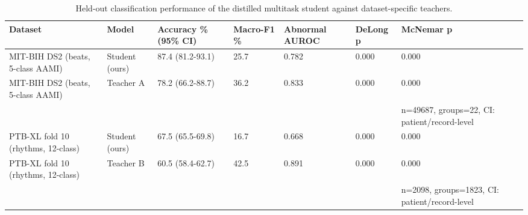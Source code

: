 \begin{table}[t]
\centering
\caption{Held-out classification performance of the distilled multitask student against dataset-specific teachers.}
\label{tab:classification}
\begin{tabular}{lllllll}
\toprule
Dataset & Model & Accuracy \% (95\% CI) & Macro-F1 \% & Abnormal AUROC & DeLong p & McNemar p \\
\midrule
MIT-BIH DS2 (beats, 5-class AAMI) & Student (ours) & 87.4 (81.2-93.1) & 25.7 & 0.782 & 0.000 & 0.000 \\
MIT-BIH DS2 (beats, 5-class AAMI) & Teacher A & 78.2 (66.2-88.7) & 36.2 & 0.833 & 0.000 & 0.000 \\
 &  &  &  &  &  & n=49687, groups=22, CI: patient/record-level \\
PTB-XL fold 10 (rhythms, 12-class) & Student (ours) & 67.5 (65.5-69.8) & 16.7 & 0.668 & 0.000 & 0.000 \\
PTB-XL fold 10 (rhythms, 12-class) & Teacher B & 60.5 (58.4-62.7) & 42.5 & 0.891 & 0.000 & 0.000 \\
 &  &  &  &  &  & n=2098, groups=1823, CI: patient/record-level \\
\bottomrule
\end{tabular}
\end{table}
